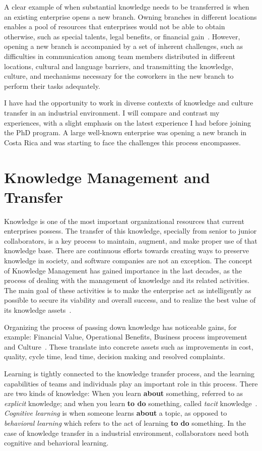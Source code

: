 \documentclass[12pt, letterpaper]{article}
\begin{document}
A clear example of when substantial knowledge needs to be transferred is when an existing 
enterprise opens a new branch.
Owning branches in different locations enables a pool of resources that enterprises would not be able
to obtain otherwise, such as special talents, legal benefits, or financial gain~\cite{ceruttia07}. However, 
opening a new branch is accompanied by a set of inherent challenges, such as 
difficulties in communication among team members distributed in different locations, 
cultural and language barriers, and transmitting the knowledge, culture, and mechanisms necessary for the 
coworkers in the new branch to perform their tasks adequately.

I have had the opportunity to work in diverse contexts of knowledge and culture transfer in 
an industrial environment. I will compare and contrast my experiences, with a slight emphasis on the 
latest experience I had before joining the PhD program. A large well-known enterprise was 
opening a new branch in Costa Rica and was starting to face the challenges this process encompasses.  

\section{Knowledge Management and Transfer}
Knowledge is one of the most important organizational resources that current enterprises possess.
The transfer of this knowledge, specially from senior to junior collaborators, 
is a key process to maintain, augment, and
make proper use of that knowledge base. 
There are continuous efforts towards creating ways to preserve knowledge in society, and software 
companies are not an exception. The concept of Knowledge Management
has gained importance in the last decades, as the process of dealing with the management 
of knowledge and its related activities. 
The main goal of these activities is to make the enterprise act as intelligently as possible to secure its viability and overall success, and
to realize the best value of its knowledge assets~\cite{wiig97}.

Organizing the process of passing down knowledge has noticeable gains, 
for example: Financial
Value, Operational Benefits, Business process improvement and Culture~\cite{ibrahim09}. These translate into concrete assets such as
improvements in cost, quality, cycle time, lead time, decision making and resolved complaints.

Learning is tightly connected to the knowledge transfer
process, and the learning capabilities of teams and individuals play an important role in 
this process.
There are two kinds of knowledge: When you learn \textbf{about} something, referred to as \textit{explicit} 
knowledge; and when you learn \textbf{to do} something, called \textit{tacit} knowledge~\cite{cook99}. 
\textit{Cognitive learning} is when someone learns \textbf{about} a topic, as opposed to 
\textit{behavioral learning} which refers to the act of learning \textbf{to do} something.
In the case of knowledge transfer in a industrial environment, collaborators need both cognitive and
behavioral learning.
\end{document}

